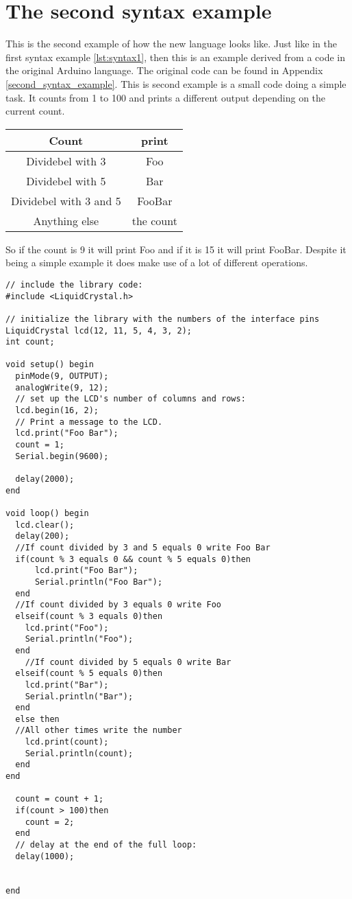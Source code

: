 \section{The second syntax example}
This is the second example of how the new language looks like. Just like in the first syntax example \ref{lst:syntax1}, then this is an example derived from a code in the original Arduino language. The original code can be found in Appendix \ref{second_syntax_example}. This is second example is a small code doing a simple task.
It counts from 1 to 100 and prints a different output depending on the current count.\\
\begin{table}[h]
\centering
\begin{tabular}{|c|c|}
\hline 
Count & print \\ 
\hline 
Dividebel with 3 & Foo \\ 
\hline 
Dividebel with 5 & Bar \\ 
\hline 
Dividebel with 3 and 5 & FooBar \\ 
\hline 
Anything else & the count \\ 
\hline 
\end{tabular} 
\end{table}

So if the count is 9 it will print Foo and if it is 15 it will print FooBar. Despite it being a simple example it does make use of a lot of different operations.

\begin{lstlisting}[caption=LCD code example based on the source language, label=lst:syntax2]
// include the library code:
#include <LiquidCrystal.h>

// initialize the library with the numbers of the interface pins
LiquidCrystal lcd(12, 11, 5, 4, 3, 2);
int count;

void setup() begin
  pinMode(9, OUTPUT);
  analogWrite(9, 12);
  // set up the LCD's number of columns and rows: 
  lcd.begin(16, 2);
  // Print a message to the LCD.
  lcd.print("Foo Bar");
  count = 1;
  Serial.begin(9600);

  delay(2000);
end

void loop() begin
  lcd.clear();
  delay(200);
  //If count divided by 3 and 5 equals 0 write Foo Bar
  if(count % 3 equals 0 && count % 5 equals 0)then
      lcd.print("Foo Bar"); 
      Serial.println("Foo Bar"); 
  end
  //If count divided by 3 equals 0 write Foo 
  elseif(count % 3 equals 0)then
    lcd.print("Foo");
    Serial.println("Foo"); 
  end
    //If count divided by 5 equals 0 write Bar 
  elseif(count % 5 equals 0)then
    lcd.print("Bar");
    Serial.println("Bar"); 
  end
  else then
  //All other times write the number
    lcd.print(count);
    Serial.println(count); 
  end
end

  count = count + 1;
  if(count > 100)then
    count = 2;
  end
  // delay at the end of the full loop:
  delay(1000);


end
\end{lstlisting}
